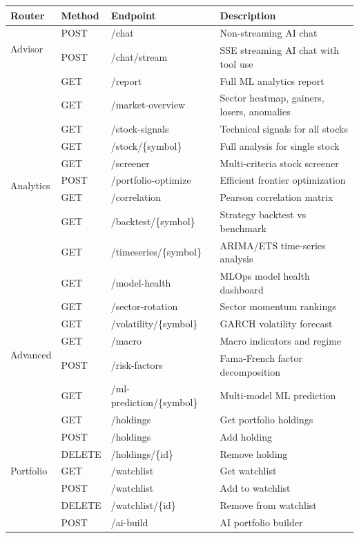 \documentclass[12pt, a4paper, oneside]{report}
\begin{document}
\begin{longtable}{@{}l l l p{6cm}@{}}
\toprule
\textbf{Router} & \textbf{Method} & \textbf{Endpoint} & \textbf{Description} \\
\midrule
\endhead
\multirow{2}{*}{Advisor} & POST & /chat & Non-streaming AI chat \\
& POST & /chat/stream & SSE streaming AI chat with tool use \\
\midrule
\multirow{10}{*}{Analytics} & GET & /report & Full ML analytics report \\
& GET & /market-overview & Sector heatmap, gainers, losers, anomalies \\
& GET & /stock-signals & Technical signals for all stocks \\
& GET & /stock/\{symbol\} & Full analysis for single stock \\
& GET & /screener & Multi-criteria stock screener \\
& POST & /portfolio-optimize & Efficient frontier optimization \\
& GET & /correlation & Pearson correlation matrix \\
& GET & /backtest/\{symbol\} & Strategy backtest vs benchmark \\
& GET & /timeseries/\{symbol\} & ARIMA/ETS time-series analysis \\
& GET & /model-health & MLOps model health dashboard \\
\midrule
\multirow{5}{*}{Advanced} & GET & /sector-rotation & Sector momentum rankings \\
& GET & /volatility/\{symbol\} & GARCH volatility forecast \\
& GET & /macro & Macro indicators and regime \\
& POST & /risk-factors & Fama-French factor decomposition \\
& GET & /ml-prediction/\{symbol\} & Multi-model ML prediction \\
\midrule
\multirow{7}{*}{Portfolio} & GET & /holdings & Get portfolio holdings \\
& POST & /holdings & Add holding \\
& DELETE & /holdings/\{id\} & Remove holding \\
& GET & /watchlist & Get watchlist \\
& POST & /watchlist & Add to watchlist \\
& DELETE & /watchlist/\{id\} & Remove from watchlist \\
& POST & /ai-build & AI portfolio builder \\

\end{longtable}
\end{document}
